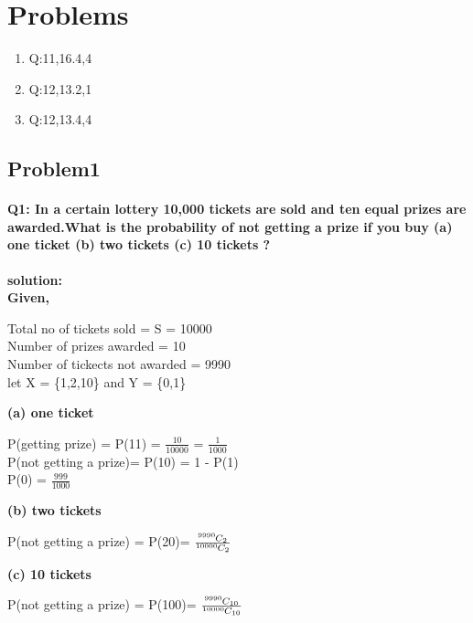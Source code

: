 \documentclass[10pt, a4paper]{article}
\title{\mytitle}
\author{\myauthor\hspace{1em}\\\contact\\FWC22088\hspace{6.5em}IITH\hspace{0.5em}\mymodule\hspace{6em}probability}
\newcommand*{\permcomb}[4][0mu]{{{}^{#3}\mkern#1#2_{#4}}}
\newcommand*{\comb}[1][-1mu]{\permcomb[#1]{C}}
\begin{document}
	\maketitle
\section{Problems}
\begin{enumerate}
\item Q:11,16.4,4
\item\label{prob:second} Q:12,13.2,1
\item \label{prob:third} Q:12,13.4,4
\end{enumerate}
\subsection{Problem1}
\paragraph{Q1: In a certain lottery 10,000 tickets are sold and ten equal prizes are awarded.What is the probability of not getting a prize if you buy (a) one ticket (b) two tickets (c) 10 tickets ?\\}	

\textbf{solution:}\\
\textbf{Given,}\\
\begin{center}
Total no of tickets sold = S = 10000\\
Number of prizes awarded = 10\\
Number of tickects not awarded = 9990\\
let X = \{1,2,10\} and Y = \{0,1\}
\end{center}
\textbf{(a) one ticket}\\
\begin{center}
P(getting prize) = P(11) = $\frac{10}{10000}$ = $\frac{1}{1000}$\\
P(not getting a prize)= P(10) = 1 - P(1)\\
P(0) = $ \frac{999}{1000}$
\end{center}
\textbf{(b) two tickets}
\begin{center}
P(not getting a prize) = P(20)= $\frac{\comb{9990}{2}}{\comb{10000}{2}} $
\end{center}
\textbf{(c) 10 tickets}
\begin{center}
P(not getting a prize) = P(100)= $\frac{\comb{9990}{10}}{\comb{10000}{10}} $
\end{center}
\end{document}
